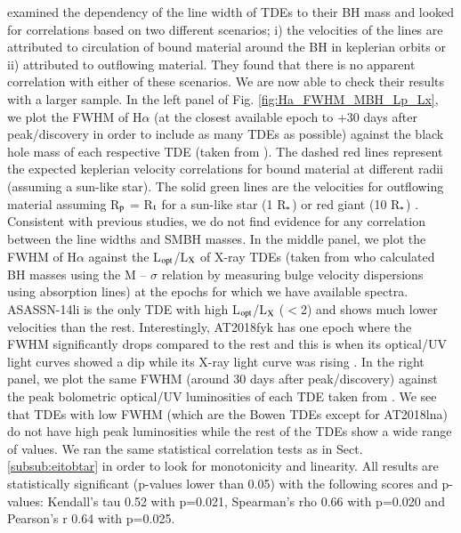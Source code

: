 \documentclass[structabstract]{aa}
\begin{document}
\citet{Arcavi2014} examined the dependency of the line width of TDEs to their BH mass and looked for correlations based on two different scenarios; i) the velocities of the lines are attributed to circulation of bound material around the BH in keplerian orbits or ii) attributed to outflowing material. They found that there is no apparent correlation with either of these scenarios. We are now able to check their results with a larger sample. 
In the left panel of Fig. \ref{fig:Ha_FWHM_MBH_Lp_Lx}, %
we plot the FWHM of H$\alpha$ (at the closest available epoch to +30 days after peak/discovery in order to include as many TDEs as possible) against the black hole mass of each respective TDE (taken from \citealt{Wevers2019a}). The dashed red lines represent the expected keplerian velocity correlations for bound material at different radii (assuming a sun-like star). The solid green lines are the \citet{Strubbe2009} velocities for outflowing material assuming R$_{\rm p}$ = R$_{\rm t}$ for a sun-like star (1 R$_{\rm *}$) or red giant (10 R$_{\rm *}$) \citep[see][Eqs. 2 \& 4]{Arcavi2014}. Consistent with previous studies, we do not find evidence for any correlation between the line widths and SMBH masses. In the middle panel, we plot the FWHM of H$\alpha$ against the L$_{\rm opt}$/L$_{\rm X}$ of X-ray TDEs (taken from \citet{Wevers2019a} who calculated BH masses using the M -- $\sigma$ relation by measuring bulge velocity dispersions using absorption lines) at the epochs for which we have available spectra. ASASSN-14li is the only TDE with high L$_{\rm opt}$/L$_{\rm X}$ ($<$2) and shows much lower velocities than the rest. Interestingly, AT2018fyk has one epoch where the FWHM significantly drops compared to the rest and this is when its optical/UV light curves showed a dip while its X-ray light curve was rising \citep{Wevers2019}.
In the right panel, we plot the same FWHM (around 30 days after peak/discovery) against the peak bolometric optical/UV luminosities of each TDE taken from \citet{Hinkle2021a}. We see that TDEs with low FWHM (which are the  Bowen TDEs except for AT2018lna) do not have high peak luminosities while the rest of the TDEs show a wide range of values. We ran the same statistical correlation tests as in Sect. \ref{subsub:eitobtar} in order to look for monotonicity and linearity. All results are statistically significant (p-values lower than 0.05) with the following scores and p-values: Kendall's tau 0.52 with p=0.021, Spearman's rho 0.66 with p=0.020 and Pearson's r 0.64 with p=0.025.
\end{document}
